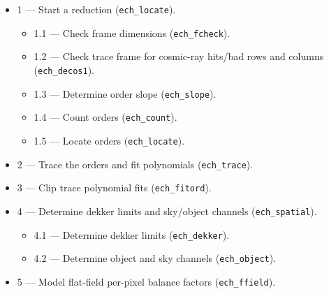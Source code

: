 \documentclass[11pt,twoside]{article}
\newcommand{\htmlref}[2]{#1}
\newcommand{\myindex}[1]{\index{#1}}
\renewcommand{\myindex}[1]{}
\begin{document}
\begin{itemize}

\item 1 --- Start a reduction (\verb+ech_locate+).

\begin{itemize}

   \item 1.1 --- Check frame dimensions
         (\htmlref{{\tt{ech\_fcheck}}}{ech_fcheck}).

   \item {1.2 --- Check trace frame for cosmic-ray hits/bad rows and columns
         (\htmlref{{\tt{ech\_decos1}}}{ech_decos1}).}

   \item {1.3 --- Determine order slope
         (\htmlref{{\tt{ech\_slope}}}{ech_slope}).}

   \item {1.4 --- Count orders
         (\htmlref{{\tt{ech\_count}}}{ech_count}).}

   \item {1.5 --- Locate orders
         (\htmlref{{\tt{ech\_locate}}}{ech_locate}).}

\end{itemize}

\item {2 --- Trace the orders and fit polynomials
      (\htmlref{{\tt{ech\_trace}}}{ech_trace}).}
\myindex{Order!tracing}
\myindex{Trace!orders}

\item {3 --- Clip trace polynomial fits
      (\htmlref{{\tt{ech\_fitord}}}{ech_fitord}).}
\myindex{Dekker limits}
\myindex{Object limits}
\myindex{Extraction limits}

\item {4 --- Determine dekker limits and sky/object channels
      (\htmlref{{\tt{ech\_spatial}}}{ech_spatial}).}

\begin{itemize}
\item {4.1 --- Determine dekker limits
      (\htmlref{{\tt{ech\_dekker}}}{ech_dekker}).}

\item {4.2 --- Determine object and sky channels
      (\htmlref{{\tt{ech\_object}}}{ech_object}).}

\end{itemize}

\myindex{Flat field}
\item {5 --- Model flat-field per-pixel balance factors
      (\htmlref{{\tt{ech\_ffield}}}{ech_ffield}).}


\end{itemize}
\end{document}
